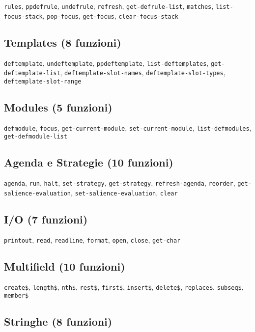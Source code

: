 \texttt{rules}, \texttt{ppdefrule}, \texttt{undefrule}, \texttt{refresh}, \texttt{get-defrule-list}, \texttt{matches}, \texttt{list-focus-stack}, \texttt{pop-focus}, \texttt{get-focus}, \texttt{clear-focus-stack}

\subsection{Templates (8 funzioni)}

\texttt{deftemplate}, \texttt{undeftemplate}, \texttt{ppdeftemplate}, \texttt{list-deftemplates}, \texttt{get-deftemplate-list}, \texttt{deftemplate-slot-names}, \texttt{deftemplate-slot-types}, \texttt{deftemplate-slot-range}

\subsection{Modules (5 funzioni)}

\texttt{defmodule}, \texttt{focus}, \texttt{get-current-module}, \texttt{set-current-module}, \texttt{list-defmodules}, \texttt{get-defmodule-list}

\subsection{Agenda e Strategie (10 funzioni)}

\texttt{agenda}, \texttt{run}, \texttt{halt}, \texttt{set-strategy}, \texttt{get-strategy}, \texttt{refresh-agenda}, \texttt{reorder}, \texttt{get-salience-evaluation}, \texttt{set-salience-evaluation}, \texttt{clear}

\subsection{I/O (7 funzioni)}

\texttt{printout}, \texttt{read}, \texttt{readline}, \texttt{format}, \texttt{open}, \texttt{close}, \texttt{get-char}

\subsection{Multifield (10 funzioni)}

\texttt{create\$}, \texttt{length\$}, \texttt{nth\$}, \texttt{rest\$}, \texttt{first\$}, \texttt{insert\$}, \texttt{delete\$}, \texttt{replace\$}, \texttt{subseq\$}, \texttt{member\$}

\subsection{Stringhe (8 funzioni)}

